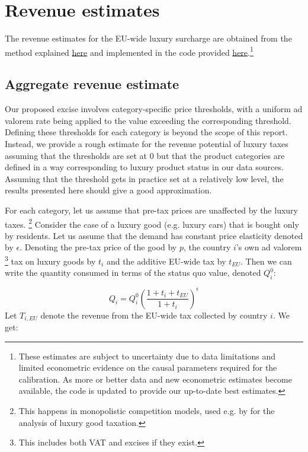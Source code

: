 \documentclass[../../main]{subfiles}
\begin{document}
\section{Revenue estimates}

The revenue estimates for the EU-wide luxury surcharge are obtained from the method explained \href{https://github.com/Montagnard/rapport-GRA-ft.-GC/blob/main/annexes/luxury/methodology/luxury_good_data_method.txt}{here} and implemented in the code provided \href{https://github.com/Montagnard/rapport-GRA-ft.-GC/blob/main/annexes/luxury/methodology/luxury_good_data.py}{here}.\footnote{These estimates are subject to uncertainty due to data limitations and limited econometric evidence on the causal parameters required for the calibration. As more or better data and new econometric estimates become available, the code is updated to provide our up-to-date best estimates.}

\subsection{Aggregate revenue estimate}

Our proposed excise involves category-specific price thresholds, with a uniform ad valorem rate being applied to the value exceeding the corresponding threshold. Defining these thresholds for each category is beyond the scope of this report. Instead, we provide a rough estimate for the revenue potential of luxury taxes assuming %
that the thresholds are set at 0 but that the product categories are defined in a way corresponding to luxury product status in our data sources. Assuming that the threshold gets in practice set at a relatively low level, the results presented here should give a good approximation.

For each category, let us assume that pre-tax prices are unaffected by the luxury taxes. \footnote{This happens in monopolistic competition models, used e.g. by \citet{Xie2026} for the analysis of luxury good taxation.} Consider the case of a luxury good (e.g. luxury cars) that is bought only by residents. Let us assume that the demand has constant price elasticity denoted by $\epsilon$.  Denoting the pre-tax price of the good by $p$, the country $i$'s own ad valorem \footnote{This includes both VAT and excises if they exist.} tax on luxury goods by $t_{i}$ and the additive EU-wide tax by $t_{EU}$. Then we can write the quantity consumed in terms of the status quo value, denoted $Q_i^0$:

\[
Q_i=Q_i^0 \left(\frac{1+t_i+t_{EU}}{1+t_i}\right)^{\epsilon}
\]
Let $T_{i,EU}$ denote the revenue from the EU-wide tax collected by country $i$. We get:
\end{document}

